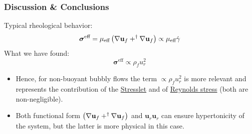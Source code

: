 \documentclass{sintefbeamer}
\begin{document}
\section*{}






\begin{frame}
  \frametitle{Discussion \& Conclusions}

Typical rheological behavior:
 \begin{equation}
\bm\sigma^\text{eff} =  \mu_\text{eff} \left(\mathbf{\nabla} \textbf{u}_f + ^\dagger \mathbf{\nabla} \textbf{u}_f\right) \propto \mu_\text{eff} \dot{\gamma}
\end{equation}
What we have found: 
\begin{equation}
  \bm\sigma^\text{eff}
  \propto \rho_f u_r^2
\end{equation}


\begin{itemize}
  \item Hence, for non-buoyant bubbly flows the term $\propto \rho_f u_r^2$ is more relevant and represents the  contribution of the \underline{Stresslet} and of \underline{Reynolds stress} (both are non-negligible).
  \item Both functional form $\left(\mathbf{\nabla} \textbf{u}_f + ^\dagger \mathbf{\nabla} \textbf{u}_f\right)$ and $ \textbf{u}_r \textbf{u}_r$ can ensure hypertonicity of the system, but the latter is more physical in this case.
\end{itemize}
\end{frame}
\end{document}
